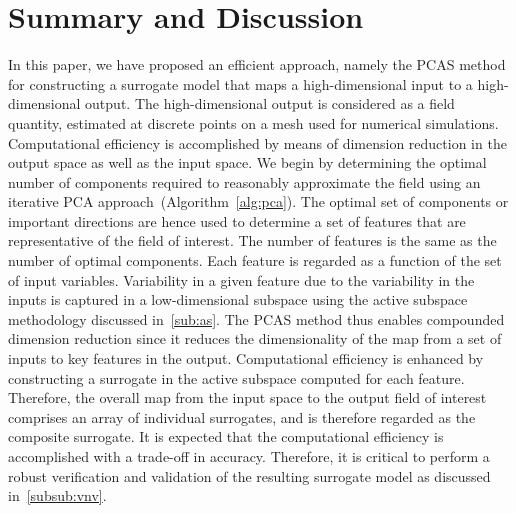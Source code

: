 \section{Summary and Discussion}
\label{sec:conc}

In this paper, we have proposed an efficient approach, namely the PCAS method for constructing a surrogate model that 
maps a high-dimensional input to a high-dimensional output. The high-dimensional output is considered as a field quantity,
estimated at discrete points on a mesh used for numerical simulations. Computational efficiency is
accomplished by means of dimension reduction in the output space as well as the input space.
We begin by determining the optimal number of
components required to reasonably approximate the field using an iterative PCA approach~(Algorithm~\ref{alg:pca}).
The optimal set of components or important directions are hence used to determine a set of features that
are representative of the field of interest. The number of features is the same as the number of optimal components.
Each feature is regarded as a function of the set of input variables. Variability in a given feature due to the variability
in the inputs is captured in a low-dimensional subspace using the active subspace methodology discussed
in~\ref{sub:as}. The PCAS method thus enables compounded dimension reduction since it reduces the dimensionality
of the map from a set of inputs to key features in the output. Computational efficiency is enhanced by constructing 
a surrogate in the active subspace computed for each feature. Therefore, the overall map from the input space
to the output field of interest comprises an array of individual surrogates, and is therefore regarded as the
composite surrogate. It is expected that the computational efficiency is accomplished with a trade-off in accuracy.
Therefore, it is critical to perform a robust verification and validation of the resulting surrogate model as discussed
in~\ref{subsub:vnv}. 

